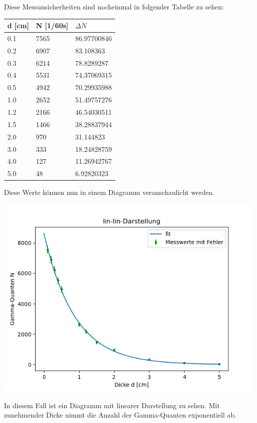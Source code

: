 \documentclass[titlepage=firstcover, captions=tableheading]{scrartcl}
\begin{document}
\noindent Diese Messunsicherheiten sind nocheinmal in folgender Tabelle zu sehen:
\begin{center}
    \begin{tabular}{lll}
        \toprule
        d [cm] & N [1/60s] & $\Delta N$ \\
        \midrule
        0.1  &   7565 & 86.97700846 \\
        0.2  &   6907 & 83.108363   \\
        0.3  &   6214 & 78.8289287  \\
        0.4  &   5531 & 74.37069315 \\
        0.5  &   4942 & 70.29935988 \\
        1.0  &   2652 & 51.49757276\\
        1.2  &   2166 & 46.54030511 \\
        1.5  &   1466 & 38.28837944 \\
        2.0  &    970 & 31.144823   \\
        3.0  &    333 & 18.24828759 \\
        4.0  &    127 & 11.26942767  \\
        5.0  &     48 & 6.92820323\\ 
        \bottomrule
    \end{tabular}  
\end{center}

\noindent Diese Werte können nun in einem Diagramm veranschaulicht werden.

\includegraphics{3.png}

\noindent In diesem Fall ist ein Diagramm mit linearer Darstellung zu sehen. 
Mit zunehmender Dicke nimmt die Anzahl der Gamma-Quanten exponentiell ab.
\end{document}
